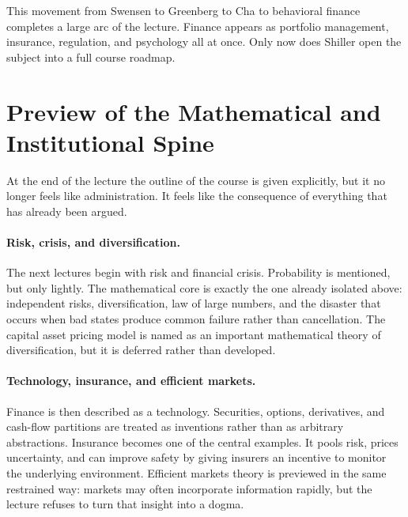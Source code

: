 This movement from Swensen to Greenberg to Cha to behavioral finance completes a large arc of the lecture. Finance appears as portfolio management, insurance, regulation, and psychology all at once. Only now does Shiller open the subject into a full course roadmap.

\section{Preview of the Mathematical and Institutional Spine}

At the end of the lecture the outline of the course is given explicitly, but it no longer feels like administration. It feels like the consequence of everything that has already been argued.

\paragraph{Risk, crisis, and diversification.}
The next lectures begin with risk and financial crisis. Probability is mentioned, but only lightly. The mathematical core is exactly the one already isolated above: independent risks, diversification, law of large numbers, and the disaster that occurs when bad states produce common failure rather than cancellation. The capital asset pricing model is named as an important mathematical theory of diversification, but it is deferred rather than developed.

\paragraph{Technology, insurance, and efficient markets.}
Finance is then described as a technology. Securities, options, derivatives, and cash-flow partitions are treated as inventions rather than as arbitrary abstractions. Insurance becomes one of the central examples. It pools risk, prices uncertainty, and can improve safety by giving insurers an incentive to monitor the underlying environment. Efficient markets theory is previewed in the same restrained way: markets may often incorporate information rapidly, but the lecture refuses to turn that insight into a dogma.

